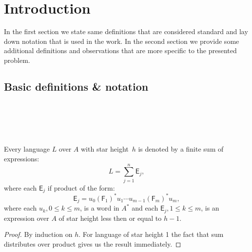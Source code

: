 \chapter{Introduction}

In the first section we state same definitions that are considered standard and lay down notation that is used in the work. In the second section we provide some additional definitions and observations that are more specific to the presented problem.

\section{Basic definitions \& notation}

\begin{defn} \\
    \\
\end{defn}

\begin{defn} \\
\end{defn}

\begin{defn}
\end{defn}

\begin{lemma}\label{lm:distributivity}
    Every language $L$ over $A$ with star height~$h$ is denoted by a finite sum of expressions:
    \[
        L = \sum_{j=1}^n \mathsf{E}_j,
    \]
    where each $\mathsf{E}_j$ if product of the form:
    \[
        \mathsf{E}_j = u_0{(\mathsf{F}_1)}^*u_1 \dotsm u_{m-1}{(\mathsf{F}_m)}^*u_m,
    \]
    where each $u_k, 0 \leq k \leq m$, is a word in $A^*$ and each $\mathsf{E}_j, 1 \leq k \leq m$, is an expression over $A$ of star height less then or equal to $h-1$.
\end{lemma}

\begin{proof}
    By induction on $h$. For language of star height 1 the fact that sum distributes over product gives us the result immediately. 
\end{proof}

\begin{lemma} \\
\end{lemma}

